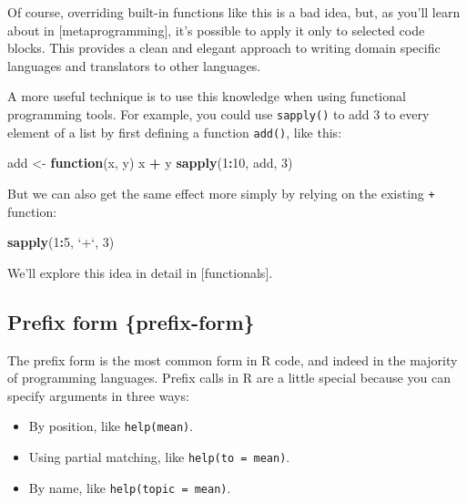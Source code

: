 \documentclass[]{book}
\newenvironment{Shaded}{\begin{snugshade}}{\end{snugshade}}
\newcommand{\KeywordTok}[1]{\textcolor[rgb]{0.13,0.29,0.53}{\textbf{#1}}}
\newcommand{\DataTypeTok}[1]{\textcolor[rgb]{0.13,0.29,0.53}{#1}}
\newcommand{\DecValTok}[1]{\textcolor[rgb]{0.00,0.00,0.81}{#1}}
\newcommand{\StringTok}[1]{\textcolor[rgb]{0.31,0.60,0.02}{#1}}
\newcommand{\ControlFlowTok}[1]{\textcolor[rgb]{0.13,0.29,0.53}{\textbf{#1}}}
\newcommand{\OperatorTok}[1]{\textcolor[rgb]{0.81,0.36,0.00}{\textbf{#1}}}
\newcommand{\NormalTok}[1]{#1}
\providecommand{\tightlist}{%
  \setlength{\itemsep}{0pt}\setlength{\parskip}{0pt}}
\theoremstyle{definition}
\theoremstyle{definition}
\theoremstyle{definition}
\theoremstyle{remark}
\begin{document}
Of course, overriding built-in functions like this is a bad idea, but,
as you'll learn about in {[}metaprogramming{]}, it's possible to apply
it only to selected code blocks. This provides a clean and elegant
approach to writing domain specific languages and translators to other
languages.

A more useful technique is to use this knowledge when using functional
programming tools. For example, you could use \texttt{sapply()} to add 3
to every element of a list by first defining a function \texttt{add()},
like this:

\begin{Shaded}
\begin{Highlighting}[]
\NormalTok{add <-}\StringTok{ }\ControlFlowTok{function}\NormalTok{(x, y) x }\OperatorTok{+}\StringTok{ }\NormalTok{y}
\KeywordTok{sapply}\NormalTok{(}\DecValTok{1}\OperatorTok{:}\DecValTok{10}\NormalTok{, add, }\DecValTok{3}\NormalTok{)}
\end{Highlighting}
\end{Shaded}

But we can also get the same effect more simply by relying on the
existing \texttt{+} function:

\begin{Shaded}
\begin{Highlighting}[]
\KeywordTok{sapply}\NormalTok{(}\DecValTok{1}\OperatorTok{:}\DecValTok{5}\NormalTok{, }\StringTok{`}\DataTypeTok{+}\StringTok{`}\NormalTok{, }\DecValTok{3}\NormalTok{)}
\end{Highlighting}
\end{Shaded}

We'll explore this idea in detail in {[}functionals{]}.

\subsection{Prefix form \{prefix-form\}}\label{prefix-form-prefix-form}

The prefix form is the most common form in R code, and indeed in the
majority of programming languages. Prefix calls in R are a little
special because you can specify arguments in three ways:

\begin{itemize}
\tightlist
\item
  By position, like \texttt{help(mean)}.
\item
  Using partial matching, like \texttt{help(to\ =\ mean)}.
\item
  By name, like \texttt{help(topic\ =\ mean)}.
\end{itemize}
\end{document}
